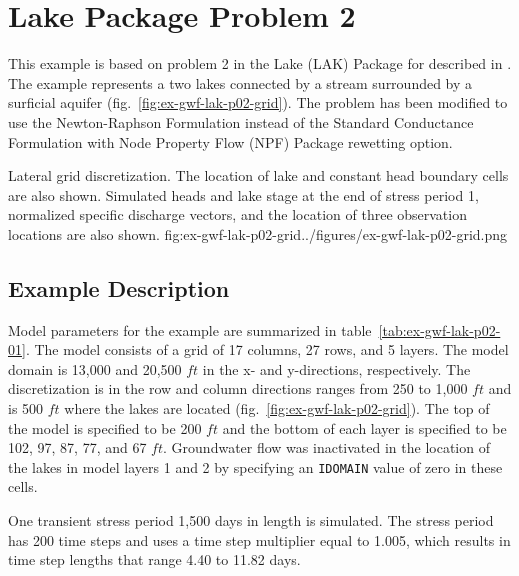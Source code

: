 \section{Lake Package Problem 2}

This example is based on problem 2 in the Lake (LAK) Package for \mftk described in \cite{modflowlak3pack}. The example represents a two lakes connected by a stream surrounded by a surficial aquifer (fig.~\ref{fig:ex-gwf-lak-p02-grid}). The problem has been modified to use the Newton-Raphson Formulation instead of the Standard Conductance Formulation with Node Property Flow (NPF) Package rewetting option.                               

\begin{StandardFigure}{
                                     Lateral grid discretization. The location of lake and constant head boundary
                                     cells are also shown. Simulated heads and lake stage at the end of stress 
                                     period 1, normalized specific discharge vectors, and the location of three 
                                     observation locations are also shown.
                                     }{fig:ex-gwf-lak-p02-grid}{../figures/ex-gwf-lak-p02-grid.png}
\end{StandardFigure}   


\subsection{Example Description}
Model parameters for the example are summarized in table~\ref{tab:ex-gwf-lak-p02-01}.  The model consists of a grid of 17 columns, 27 rows, and 5 layers. The model domain is 13,000 and 20,500 $ft$ in the x- and y-directions, respectively. The discretization is in the row and column directions ranges from 250 to 1,000 $ft$ and is 500 $ft$ where the lakes are located (fig.~\ref{fig:ex-gwf-lak-p02-grid}). The top of the model is specified to be 200 $ft$ and the bottom of each layer is specified to be 102, 97, 87, 77, and 67 $ft$. Groundwater flow was inactivated in the location of the lakes in model layers 1 and 2 by specifying an \texttt{IDOMAIN} value of zero in these cells.

One transient stress period 1,500 days in length is simulated. The stress period has 200 time steps and uses a time step multiplier equal to 1.005, which results in time step lengths that range 4.40 to 11.82 days.

